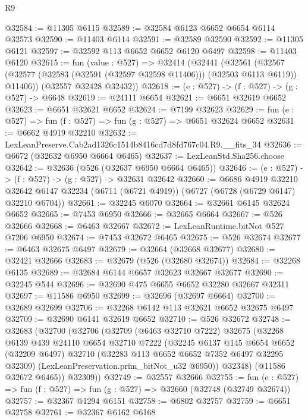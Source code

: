 \begin{lexlean}{R9}
\begin{coremodule}
@32584 := @11305 @6115
@32589 := @32584 @6123 @6652 @6654 @6114 @32573
@32590 := @11403 @6114
@32591 := @32589 @32590
@32592 := @11305 @6121
@32597 := @32592 @113 @6652 @6652 @6120 @6497
@32598 := @11403 @6120
@32615 := fun (value : @527) =>
  @32414
    (@32441
      (@32561
        (@32567 (@32577 (@32583 (@32591 (@32597 @32598 @11406))) (@32503 @6113 @6119)) @11406))
      (@32557 @32428 @32432))
@32618 := (e : @527) -> (f : @527) -> (g : @527) -> @6648
@32619 := @24111 @6654
@32621 := @6651 @32619 @6652
@32623 := @6651 @32621 @6652
@32624 := @7199 @32623
@32629 := fun (e : @527) => fun (f : @527) => fun (g : @527) => @6651 @32624 @6652
@32631 := @6662 @4919 @32210
@32632 := LexLeanPreserve.Cab2ad1326c1514b8416cd7d8fd767c04.R9.__fits_34
@32636 := @6672 (@32632 @6950 @6664 @6465)
@32637 := LexLeanStd.Sha256.choose
@32642 := @32636 (@526 (@32637 @6950 @6664 @6465))
@32646 := (e : @527) -> (f : @527) -> (g : @527) -> @32631 @32642
@32660 := @6686
    @4919
    @32210
    @32642
    @6147
    @32234
    (@6711 (@6721 @4919))
    (@6727 (@6728 (@6729 @6147) @32210 @6704))
@32661 := @32245 @6070
@32664 := @32661 @6145 @32624 @6652
@32665 := @7453 @6950
@32666 := @32665 @6664
@32667 := @526 @32666
@32668 := @6463 @32667
@32672 := LexLeanRuntime.bitNot @527 @7206 @6950
@32674 := @7453 @32672 @6465
@32675 := @526 @32674
@32677 := @6463 @32675 @6497
@32679 := @32664 (@32668 @32677)
@32680 := @32421 @32666
@32683 := @32679 (@526 (@32680 @32674))
@32684 := @32268 @6135
@32689 := @32684 @6144 @6657 @32623 @32667 @32677
@32690 := @32245 @544
@32696 := @32690 @475 @6655 @6652 @32280 @32667 @32311
@32697 := @11586 @6950
@32699 := @32696 (@32697 @6664)
@32700 := @32689 @32699
@32706 := @32268 @6142 @113 @32621 @6652 @32675 @6497
@32709 := @32690 @6141 @32619 @6652
@32710 := @526 @32672
@32748 := @32683
    (@32700
      (@32706
        (@32709
          (@6463 @32710 @7222)
          @32675
          (@32268
            @6139
            @439
            @24110
            @6654
            @32710
            @7222
            (@32245
              @6137
              @145
              @6654
              @6652
              (@32209 @6497)
              @32710
              (@32283 @113 @6652 @6652 @7352 @6497 @32295 @32309)
              (LexLeanPreservation.prim_bitNot_u32 @6950))
            @32348)
          (@11586 @32672 @6465))
        @32309))
@32749 := @32557 @32666
@32755 := fun (e : @527) => fun (f : @527) => fun (g : @527) => @32660 (@32748 (@32749 @32674))
@32757 := @32367 @1294 @6151
@32758 := @6802 @32757
@32759 := @6651 @32758
@32761 := @32367 @6162 @6168

\end{coremodule}
\end{lexlean}
